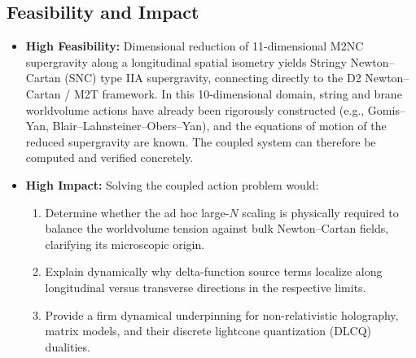 \documentclass[11pt,a4paper]{article}
\begin{document}
\subsection*{Feasibility and Impact}
\begin{itemize}
    \item \textbf{High Feasibility:} 
    Dimensional reduction of 11-dimensional M2NC supergravity along a longitudinal spatial isometry yields Stringy Newton--Cartan (SNC) type IIA supergravity, connecting directly to the D2 Newton--Cartan / M2T framework. In this 10-dimensional domain, string and brane worldvolume actions have already been rigorously constructed (e.g., Gomis--Yan, Blair--Lahnsteiner--Obers--Yan), and the equations of motion of the reduced supergravity are known. The coupled system can therefore be computed and verified concretely.
    
    \item \textbf{High Impact:}
    Solving the coupled action problem would:
    \begin{enumerate}
        \item Determine whether the ad hoc large-$N$ scaling is physically required to balance the worldvolume tension against bulk Newton--Cartan fields, clarifying its microscopic origin.
        \item Explain dynamically why delta-function source terms localize along longitudinal versus transverse directions in the respective limits.
        \item Provide a firm dynamical underpinning for non-relativistic holography, matrix models, and their discrete lightcone quantization (DLCQ) dualities.
    \end{enumerate}
\end{itemize}
\end{document}
